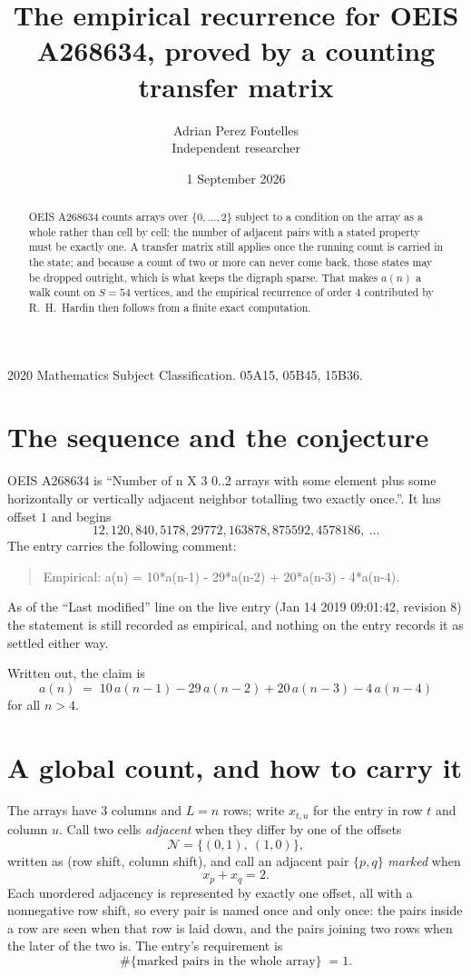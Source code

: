 \documentclass[11pt,a4paper]{article}
\title{The empirical recurrence for OEIS A268634, proved by a counting transfer matrix}
\author{Adrian Perez Fontelles\\ \small Independent researcher}
\date{1 September 2026}
\theoremstyle{plain}
\theoremstyle{definition}
\begin{document}
\maketitle

\begin{abstract}
OEIS A268634 counts arrays over $\{0,\dots,2\}$ subject to a condition on the array as a
whole rather than cell by cell: the number of adjacent pairs with a stated property must be
exactly one. A transfer matrix still applies once the running count is carried in the state; and
because a count of two or more can never come back, those states may be dropped outright,
which is what keeps the digraph sparse. That makes $a(n)$ a walk count on $S=54$ vertices,
and the empirical recurrence of order $4$ contributed by R.~H.~Hardin then follows from
a finite exact computation.
\end{abstract}

\noindent\small 2020 Mathematics Subject Classification. 05A15, 05B45, 15B36.\normalsize

\section{The sequence and the conjecture}

OEIS A268634 is ``Number of n X 3 0..2 arrays with some element plus some horizontally or vertically adjacent neighbor totalling two exactly once.''. It has offset $1$ and begins
\[
12, 120, 840, 5178, 29772, 163878, 875592, 4578186,\ \dots
\]
The entry carries the following comment:
\begin{quote}\small
Empirical: a(n) = 10*a(n-1) - 29*a(n-2) + 20*a(n-3) - 4*a(n-4).
\end{quote}
As of the ``Last modified'' line on the live entry (Jan 14 2019 09:01:42, revision 8) the statement is
still recorded as empirical, and nothing on the entry records it as settled either way.

Written out, the claim is
\begin{equation}\label{eq:conj}
a(n)\;=\;10\,a(n-1) - 29\,a(n-2) + 20\,a(n-3) - 4\,a(n-4)
\end{equation}
for all $n>4$.

\section{A global count, and how to carry it}

The arrays have $3$ columns and $L=n$ rows; write $x_{t,u}$ for the entry in
row $t$ and column $u$. Call two cells \emph{adjacent} when they differ by one of the
offsets
\[
\mathcal N=\{(0,1),\ (1,0)\},
\]
written as (row shift, column shift), and call an adjacent pair $\{p,q\}$
\emph{marked} when
\[
x_{p}+x_{q}=2 .
\]
Each unordered adjacency is represented by exactly one offset, all with a nonnegative row
shift, so every pair is named once and only once: the pairs inside a row are seen when
that row is laid down, and the pairs joining two rows when the later of the two is. The
entry's requirement is
\begin{equation}\label{eq:glob}
\#\{\text{marked pairs in the whole array}\}\;=1.
\end{equation}
\end{document}

